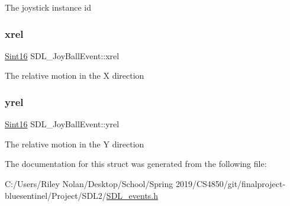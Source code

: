 The joystick instance id \mbox{\label{struct_s_d_l___joy_ball_event_a959a8473aa1964e5e1778c27a9ffd261}} 
\subsubsection{\texorpdfstring{xrel}{xrel}}
{\footnotesize\ttfamily \mbox{\hyperlink{_s_d_l__stdinc_8h_a9d0257032c0e146ab6121bf0122712f5}{Sint16}} S\+D\+L\+\_\+\+Joy\+Ball\+Event\+::xrel}

The relative motion in the X direction \mbox{\label{struct_s_d_l___joy_ball_event_a28ad48a9eb7a5d3ff62ccba09fcead76}} 
\subsubsection{\texorpdfstring{yrel}{yrel}}
{\footnotesize\ttfamily \mbox{\hyperlink{_s_d_l__stdinc_8h_a9d0257032c0e146ab6121bf0122712f5}{Sint16}} S\+D\+L\+\_\+\+Joy\+Ball\+Event\+::yrel}

The relative motion in the Y direction 

The documentation for this struct was generated from the following file\+:\begin{DoxyCompactItemize}
\item 
C\+:/\+Users/\+Riley Nolan/\+Desktop/\+School/\+Spring 2019/\+C\+S4850/git/finalproject-\/bluesentinel/\+Project/\+S\+D\+L2/\mbox{\hyperlink{_s_d_l__events_8h}{S\+D\+L\+\_\+events.\+h}}\end{DoxyCompactItemize}

